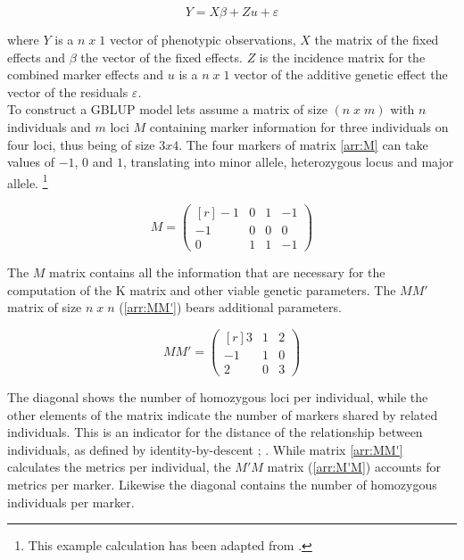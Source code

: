 \begin{equation}
Y = X \beta + Zu + \varepsilon
 \label{eqn:blup}
\end{equation}

where $Y$ is a $n\;x\;1$ vector of phenotypic observations, $X$ the matrix of the fixed
effects and $\beta$ the vector of the fixed effects. $Z$ is the incidence matrix for the
combined marker effects and $u$ is a $n\; x\; 1$ vector of the additive genetic effect
the vector of the residuals $\varepsilon$.\\
To construct a GBLUP model lets assume a matrix of size $(n\; x\; m)$ with $n$ individuals
and $m$ loci $M$ containing marker information for three individuals on four loci, thus being of
size $3x4$. The four markers of matrix \ref{arr:M} can take values of $-1$, $0$ and $1$,
translating into minor allele, heterozygous locus and major allele. \footnote{This example
calculation has been adapted from \cite{isik2013}.}

\begin{equation}
 M = 
 \begin{pmatrix}[r]
  -1 & 0 & 1 & -1 \\
  -1 & 0 & 0 & 0 \\
   0 & 1 & 1 & -1 
 \end{pmatrix}
 \label{arr:M}
\end{equation}

The $M$ matrix contains all the information that are necessary for the computation of the K matrix and other viable genetic parameters. The $MM'$ matrix of size $n\; x\; n$ (\ref{arr:MM'}) bears additional parameters.

\begin{equation}
 MM' = 
 \begin{pmatrix}[r]
  3 & 1 & 2 \\
  -1 & 1 & 0 \\
  2 & 0 & 3 
 \end{pmatrix}
 \label{arr:MM'}
\end{equation}

The diagonal shows the number of homozygous loci per individual, while the other elements
of the matrix indicate the number of markers shared by related individuals. This is an
indicator for the distance of the relationship between individuals, as defined by
identity-by-descent \cite{vanraden2008efficient}; \cite{misztal2013methods}. While matrix
\ref{arr:MM'} calculates the metrics per individual, the $M'M$ matrix (\ref{arr:M'M})
accounts for metrics per marker. Likewise the diagonal contains the number of homozygous
individuals per marker.

